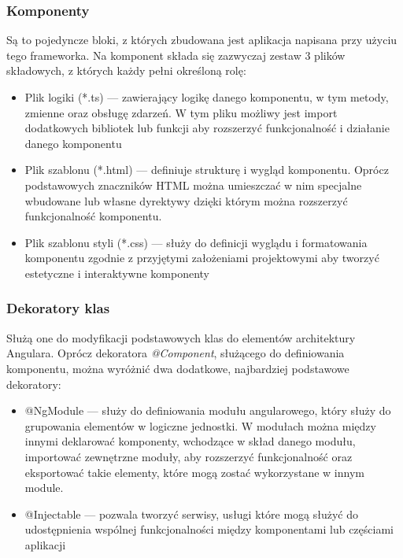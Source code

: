 \subsubsection{Komponenty}
Są to pojedyncze bloki, z których zbudowana jest aplikacja napisana przy użyciu tego frameworka. Na komponent składa się zazwyczaj zestaw 3 plików składowych, z których każdy pełni określoną rolę:
\begin{itemize}
  \item Plik logiki (*.ts) --- zawierający logikę danego komponentu, w tym metody, zmienne oraz obsługę zdarzeń. W tym pliku możliwy jest import dodatkowych bibliotek lub funkcji aby rozszerzyć funkcjonalność i działanie danego komponentu 
  \item Plik szablonu (*.html) --- definiuje strukturę i wygląd komponentu. Oprócz podstawowych znaczników HTML można umieszczać w nim specjalne wbudowane lub własne dyrektywy dzięki którym można rozszerzyć funkcjonalność komponentu.
  \item Plik szablonu styli (*.css) --- służy do definicji wyglądu i formatowania komponentu zgodnie z przyjętymi założeniami projektowymi aby tworzyć estetyczne i interaktywne komponenty
\end{itemize}

\subsubsection{Dekoratory klas}
Służą one do modyfikacji podstawowych klas do elementów architektury Angulara. Oprócz dekoratora \emph{@Component}, służącego do definiowania komponentu, można wyróżnić dwa dodatkowe, najbardziej podstawowe dekoratory:
\begin{itemize}
  \item @NgModule --- służy do definiowania modułu angularowego, który służy do grupowania elementów w logiczne jednostki. W modułach można między innymi deklarować komponenty, wchodzące w skład danego modułu, importować zewnętrzne moduły, aby rozszerzyć funkcjonalność oraz eksportować takie elementy, które mogą zostać wykorzystane w innym module.
  \item @Injectable --- pozwala tworzyć serwisy, usługi które mogą służyć do udostępnienia wspólnej funkcjonalności między komponentami lub częściami aplikacji
\end{itemize}

